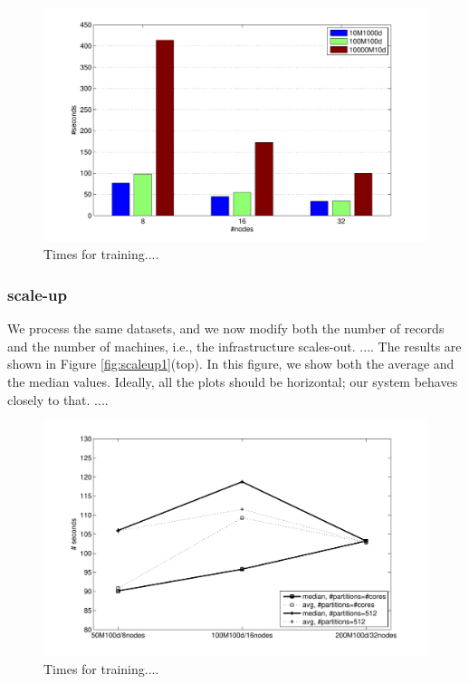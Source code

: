 \documentclass[smallextended]{svjour3}       %
\begin{document}
\begin{figure}[tb!]
\begin{center}
\centerline{\includegraphics[width=0.75\linewidth]{img/speedup1.pdf}}
\caption{Times for training....}
\label{fig:speedup1}
\end{center}
\vspace{-0.5cm}
\end{figure}

\subsubsection{scale-up} We process the same datasets, and we now modify both the number of records and the number of machines, i.e., the infrastructure scales-out. .... The results are shown in Figure \ref{fig:scaleup1}(top). In this figure, we show both the average and the median values. Ideally, all the plots should be horizontal; our system behaves closely to that. ....

\begin{figure}[tb!]
\begin{center}
\centerline{\includegraphics[width=0.75\linewidth]{img/scaleup1.pdf}}
\caption{Times for training....}
\label{fig:speedup1}
\end{center}
\vspace{-0.5cm}
\end{figure}
\end{document}
